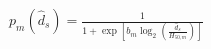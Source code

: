 \documentclass[border=8pt]{standalone}
\begin{document}
\color{ink}
$\displaystyle p_m\!\left(\widehat d_s\right)=\frac{1}{1+\exp\!\left[b_m\log_2\!\left(\frac{\widehat d_s}{H_{50,m}}\right)\right]}$
\end{document}
